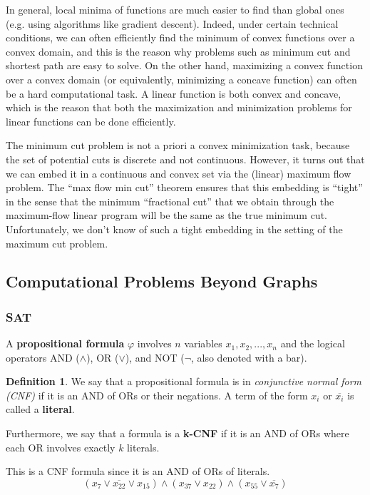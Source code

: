 \documentclass[a4paper, 12pt]{report}
\theoremstyle{remark}
\theoremstyle{definition}
\newtheorem{definition}{Definition}[section]
\begin{document}
In general, local minima of functions are much easier to find than global ones (e.g. using algorithms like gradient descent). Indeed, under certain technical conditions, we can often efficiently find the minimum of convex functions over a convex domain, and this is the reason why problems such as minimum cut and shortest path are easy to solve. On the other hand, maximizing a convex function over a convex domain (or equivalently, minimizing a concave function) can often be a hard computational task. A linear function is both convex and concave, which is the reason that both the maximization and minimization problems for linear functions can be done efficiently.

The minimum cut problem is not a priori a convex minimization task, because the set of potential cuts is discrete and not continuous. However, it turns out that we can embed it in a continuous and convex set via the (linear) maximum flow problem. The “max flow min cut” theorem ensures that this embedding is “tight” in the sense that the minimum “fractional cut” that we obtain through the maximum-flow linear program will be the same as the true minimum cut. Unfortunately, we don’t know of such a tight embedding in the setting of the maximum cut problem. 

\subsection{Computational Problems Beyond Graphs}
\subsubsection{SAT}
A \textbf{propositional formula} $\varphi$ involves $n$ variables $x_1, x_2, ..., x_n$ and the logical operators AND ($\wedge$), OR ($\vee$), and NOT ($\neg$, also denoted with a bar). 

\begin{definition}
We say that a propositional formula is in \textit{conjunctive normal form (CNF)} if it is an AND of ORs or their negations. A term of the form $x_i$ or $\overline{x_i}$ is called a \textbf{literal}. 

Furthermore, we say that a formula is a \textbf{k-CNF} if it is an AND of ORs where each OR involves exactly $k$ literals. 
\end{definition}

\begin{example}
This is a CNF formula since it is an AND of ORs of literals. 
\[(x_7 \vee \overline{x_{22}} \vee x_{15}) \wedge (x_{37} \vee x_{22}) \wedge (x_{55} \vee \overline{x_7})\]
\end{example}
\end{document}
